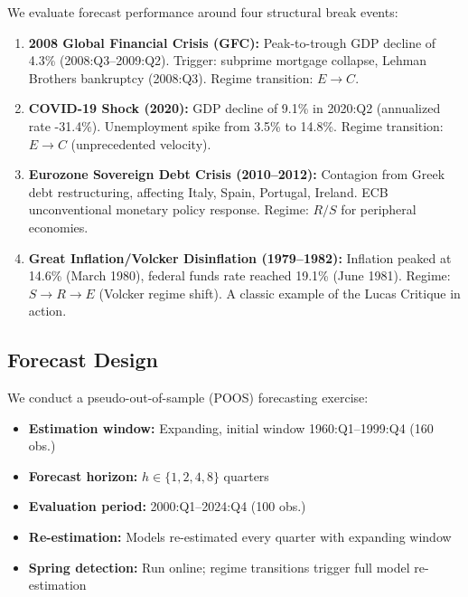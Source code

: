 \documentclass[12pt,a4paper]{article}
\begin{document}
We evaluate forecast performance around four structural break events:

\begin{enumerate}[label=\textbf{E\arabic*}, leftmargin=*]
    \item \textbf{2008 Global Financial Crisis (GFC):} Peak-to-trough
    GDP decline of 4.3\% (2008:Q3--2009:Q2).  Trigger: subprime
    mortgage collapse, Lehman Brothers bankruptcy (2008:Q3).  Regime
    transition: $E \to C$.

    \item \textbf{COVID-19 Shock (2020):} GDP decline of 9.1\% in
    2020:Q2 (annualized rate -31.4\%).  Unemployment spike from
    3.5\% to 14.8\%.  Regime transition: $E \to C$ (unprecedented
    velocity).

    \item \textbf{Eurozone Sovereign Debt Crisis (2010--2012):}
    Contagion from Greek debt restructuring, affecting Italy, Spain,
    Portugal, Ireland.  ECB unconventional monetary policy response.
    Regime: $R/S$ for peripheral economies.

    \item \textbf{Great Inflation/Volcker Disinflation (1979--1982):}
    Inflation peaked at 14.6\% (March 1980), federal funds rate
    reached 19.1\% (June 1981).  Regime: $S \to R \to E$ (Volcker
    regime shift).  A classic example of the Lucas Critique in
    action.
\end{enumerate}

\subsection{Forecast Design}

We conduct a pseudo-out-of-sample (POOS) forecasting exercise:

\begin{itemize}[leftmargin=*]
    \item \textbf{Estimation window:} Expanding, initial window
    1960:Q1--1999:Q4 (160 obs.)
    \item \textbf{Forecast horizon:} $h \in \{1, 2, 4, 8\}$ quarters
    \item \textbf{Evaluation period:} 2000:Q1--2024:Q4 (100 obs.)
    \item \textbf{Re-estimation:} Models re-estimated every quarter
    with expanding window
    \item \textbf{Spring detection:} Run online; regime transitions
    trigger full model re-estimation
\end{itemize}
\end{document}

